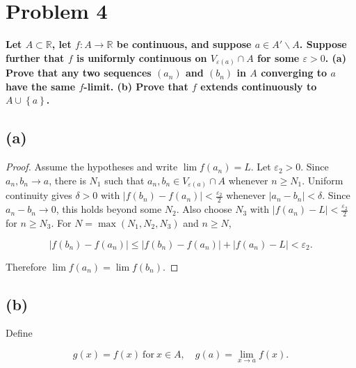\section{Problem 4}

\textbf{Let \(A \subset \mathbb{R}\), let \(f:A\rightarrow\mathbb{R}\) be continuous, and suppose \(a \in A' \smallsetminus A\). Suppose further that \(f\) is uniformly continuous on \(V_{\varepsilon{(a)}} \cap A\) for some \(\varepsilon > 0\). (a) Prove that any two sequences \(\left( a_{n} \right)\) and \(\left( b_{n} \right)\) in \(A\) converging to \(a\) have the same \(f\)-limit. (b) Prove that \(f\) extends continuously to \(A \cup \left\{ a \right\}\).}

\subsection{(a)}

\begin{proof}

Assume the hypotheses and write \(\lim f\left( a_{n} \right) = L\). Let \(\varepsilon_{2} > 0\). Since \(a_{n},b_{n}\rightarrow a\), there is \(N_{1}\) such that \(a_{n},b_{n} \in V_{\varepsilon{(a)}} \cap A\) whenever \(n \geq N_{1}\). Uniform continuity gives \(\delta > 0\) with \(\left| {f\left( b_{n} \right) - f\left( a_{n} \right)} \right| < \frac{\varepsilon_{2}}{2}\) whenever \(\left| {a_{n} - b_{n}} \right| < \delta\). Since \(a_{n} - b_{n}\rightarrow 0\), this holds beyond some \(N_{2}\). Also choose \(N_{3}\) with \(\left| {f\left( a_{n} \right) - L} \right| < \frac{\varepsilon_{2}}{2}\) for \(n \geq N_{3}\). For \(N = \max\left( {N_{1},N_{2},N_{3}} \right)\) and \(n \geq N\),

\[\left| {f\left( b_{n} \right) - f\left( a_{n} \right)} \right| \leq \left| {f\left( b_{n} \right) - f\left( a_{n} \right)} \right| + \left| {f\left( a_{n} \right) - L} \right| < \varepsilon_{2}.\]

Therefore \(\lim f\left( a_{n} \right) = \lim f\left( b_{n} \right)\).

\end{proof}

\subsection{(b)}

Define

\[g(x) = f(x)\ \text{for}\ x \in A,\quad g(a) = \lim\limits_{x\rightarrow a}f(x).\]

